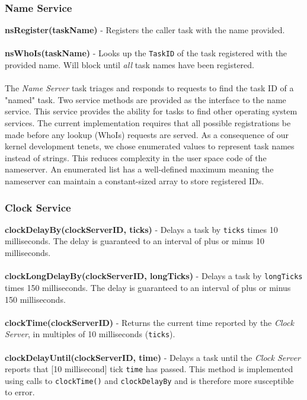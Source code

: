 \documentclass[twoside,a4paper]{refart}
\begin{document}
\subsubsection{Name Service}

\textbf{nsRegister(taskName)} - Registers the caller task with the name provided.\\\\
\textbf{nsWhoIs(taskName)} - Looks up the \verb~TaskID~ of the task registered with the provided name. Will block until \textit{all} task names have been registered.\\\\

The \textit{Name Server} task triages and responds to requests to find the task ID of a "named" task. Two service methods are provided as the interface to the name service. This service provides the ability for tasks to find other operating system services. The current implementation requires that all possible registrations be made before any lookup (WhoIs) requests are served. As a consequence of our kernel development tenets, we chose enumerated values to represent task names instead of strings. This reduces complexity in the user space code of the nameserver. An enumerated list has a well-defined maximum meaning the nameserver can maintain a constant-sized array to store registered IDs.

\subsubsection{Clock Service}

\textbf{clockDelayBy(clockServerID, ticks)} - Delays a task by \verb~ticks~ times 10 milliseconds. The delay is guaranteed to an interval of plus or minus 10 milliseconds.\\\\
\textbf{clockLongDelayBy(clockServerID, longTicks)} - Delays a task by \verb~longTicks~ times 150 milliseconds. The delay is guaranteed to an interval of plus or minus 150 milliseconds.\\\\
\textbf{clockTime(clockServerID)} - Returns the current time reported by the \textit{Clock Server}, in multiples of 10 milliseconds (\verb~ticks~).\\\\
\textbf{clockDelayUntil(clockServerID, time)} - Delays a task until the \textit{Clock Server} reports that [10 millisecond] tick \verb~time~ has passed. This method is implemented using calls to \verb~clockTime()~ and \verb~clockDelayBy~ and is therefore more susceptible to error.\\\\
\end{document}
